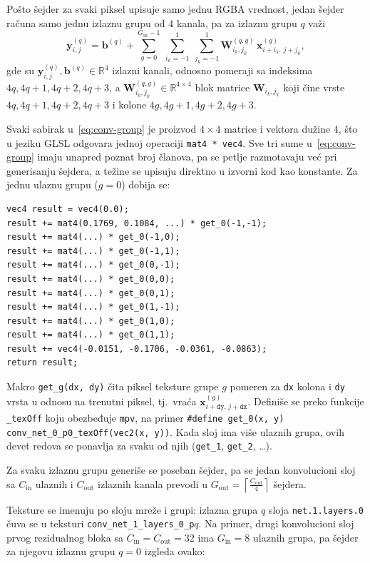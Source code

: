 \documentclass[12pt,a4paper]{article}
\begin{document}
Pošto šejder za svaki piksel upisuje samo jednu RGBA vrednost, jedan šejder računa samo jednu izlaznu grupu od 4 kanala, pa za izlaznu grupu $q$ važi
\begin{equation}
	\mathbf{y}^{(q)}_{i,j} = \mathbf{b}^{(q)} + \sum_{g=0}^{G_\text{in}-1}\ \sum_{i_k=-1}^{1}\ \sum_{j_k=-1}^{1} \mathbf{W}^{(q,g)}_{i_k,j_k}\,\mathbf{x}^{(g)}_{i+i_k,\,j+j_k},
	\label{eq:conv-group}
\end{equation}
gde su $\mathbf{y}^{(q)}_{i,j}, \mathbf{b}^{(q)} \in \mathbb{R}^4$ izlazni kanali, odnosno pomeraji sa indeksima $4q,4q+1,4q+2,4q+3$, a $\mathbf{W}^{(q,g)}_{i_k,j_k} \in \mathbb{R}^{4\times4}$ blok matrice $\mathbf{W}_{i_k,j_k}$ koji čine vrste $4q,4q+1,4q+2,4q+3$ i kolone $4g,4g+1,4g+2,4g+3$. 

Svaki sabirak u~\eqref{eq:conv-group} je proizvod $4\times4$ matrice i vektora dužine 4, što u jeziku GLSL odgovara jednoj operaciji \texttt{mat4 * vec4}. Sve tri sume u~\eqref{eq:conv-group} imaju unapred poznat broj članova, pa se petlje razmotavaju već pri generisanju šejdera, a težine se upisuju direktno u izvorni kod kao konstante. Za jednu ulaznu grupu ($g = 0$) dobija se:

\begin{verbatim}
vec4 result = vec4(0.0);
result += mat4(0.1769, 0.1084, ...) * get_0(-1,-1);
result += mat4(...) * get_0(-1,0);
result += mat4(...) * get_0(-1,1);
result += mat4(...) * get_0(0,-1);
result += mat4(...) * get_0(0,0);
result += mat4(...) * get_0(0,1);
result += mat4(...) * get_0(1,-1);
result += mat4(...) * get_0(1,0);
result += mat4(...) * get_0(1,1);
result += vec4(-0.0151, -0.1706, -0.0361, -0.0863);
return result;
\end{verbatim}

Makro \texttt{get\_g(dx, dy)} čita piksel teksture grupe $g$ pomeren za \texttt{dx} kolona i \texttt{dy} vrsta u odnosu na trenutni piksel, tj.\ vraća $\mathbf{x}^{(g)}_{i+\texttt{dy},\,j+\texttt{dx}}$. Definiše se preko funkcije \texttt{\_texOff} koju obezbeđuje \texttt{mpv}, na primer \texttt{\#define get\_0(x, y) conv\_net\_0\_p0\_texOff(vec2(x, y))}. Kada sloj ima više ulaznih grupa, ovih devet redova se ponavlja za svaku od njih (\texttt{get\_1}, \texttt{get\_2}, \dots).

Za svaku izlaznu grupu generiše se poseban šejder, pa se jedan konvolucioni sloj sa $C_\text{in}$ ulaznih i $C_\text{out}$ izlaznih kanala prevodi u $G_\text{out} = \left\lceil \frac{C_\text{out}}{4} \right\rceil$ šejdera.

Teksture se imenuju po sloju mreže i grupi: izlazna grupa $q$ sloja \texttt{net.1.layers.0} čuva se u teksturi \texttt{conv\_net\_1\_layers\_0\_p}$q$. Na primer, drugi konvolucioni sloj prvog rezidualnog bloka sa $C_\text{in} = C_\text{out} = 32$ ima $G_\text{in} = 8$ ulaznih grupa, pa šejder za njegovu izlaznu grupu $q=0$ izgleda ovako:
\end{document}
